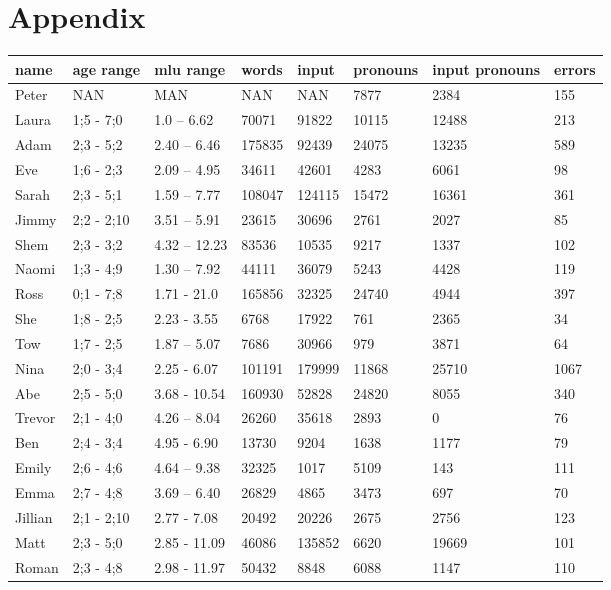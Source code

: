 \section{Appendix}
\begin{table}[]
\small
\begin{tabular}{llllllll}

name & age range & mlu range &  words & input  & pronouns & input pronouns & errors \\
\toprule
Peter & NAN & MAN & NAN & NAN & 7877 & 2384 & 155 \\
Laura & 1;5 - 7;0 & 1.0 – 6.62 & 70071 & 91822 & 10115 & 12488 & 213 \\
Adam & 2;3 - 5;2 & 2.40 – 6.46 & 175835 & 92439 & 24075 & 13235 & 589 \\
Eve & 1;6 - 2;3 & 2.09 – 4.95 & 34611 & 42601 & 4283 & 6061 & 98 \\
Sarah & 2;3 - 5;1 & 1.59 – 7.77 & 108047 & 124115 & 15472 & 16361 & 361 \\
Jimmy & 2;2 - 2;10 & 3.51 – 5.91 & 23615 & 30696 & 2761 & 2027 & 85 \\
Shem & 2;3 - 3;2 & 4.32 – 12.23 & 83536 & 10535 & 9217 & 1337 & 102 \\
Naomi & 1;3 - 4;9 & 1.30 – 7.92 & 44111 & 36079 & 5243 & 4428 & 119 \\
Ross & 0;1 - 7;8 & 1.71 - 21.0 & 165856 & 32325 & 24740 & 4944 & 397 \\
She & 1;8 - 2;5 & 2.23 - 3.55 & 6768 & 17922 & 761 & 2365 & 34 \\
Tow & 1;7 - 2;5 & 1.87 – 5.07 & 7686 & 30966 & 979 & 3871 & 64 \\
Nina & 2;0 - 3;4 & 2.25 - 6.07 & 101191 & 179999 & 11868 & 25710 & 1067 \\
Abe & 2;5 - 5;0 & 3.68 - 10.54 & 160930 & 52828 & 24820 & 8055 & 340 \\
Trevor & 2;1 - 4;0 & 4.26 – 8.04 & 26260 & 35618 & 2893 & 0 & 76 \\
Ben & 2;4 - 3;4 & 4.95 - 6.90 & 13730 & 9204 & 1638 & 1177 & 79 \\
Emily & 2;6 - 4;6 & 4.64 – 9.38 & 32325 & 1017 & 5109 & 143 & 111 \\
Emma & 2;7 - 4;8 & 3.69 – 6.40 & 26829 & 4865 & 3473 & 697 & 70 \\
Jillian & 2;1 - 2;10 & 2.77 - 7.08 & 20492 & 20226 & 2675 & 2756 & 123 \\
Matt & 2;3 - 5;0 & 2.85 - 11.09 & 46086 & 135852 & 6620 & 19669 & 101 \\
Roman & 2;3 - 4;8 & 2.98 - 11.97 & 50432 & 8848 & 6088 & 1147 & 110 \\

\end{tabular}
\end{table}
